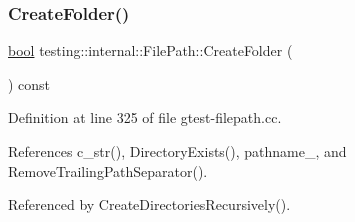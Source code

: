 \mbox{\label{classtesting_1_1internal_1_1FilePath_ae3a455e7c9fc967c2443b703e958f8bd}} 
\subsubsection{\texorpdfstring{Create\+Folder()}{CreateFolder()}}
{\footnotesize\ttfamily \hyperlink{classbool}{bool} testing\+::internal\+::\+File\+Path\+::\+Create\+Folder (\begin{DoxyParamCaption}{ }\end{DoxyParamCaption}) const}



Definition at line 325 of file gtest-\/filepath.\+cc.



References c\+\_\+str(), Directory\+Exists(), pathname\+\_\+, and Remove\+Trailing\+Path\+Separator().



Referenced by Create\+Directories\+Recursively().


